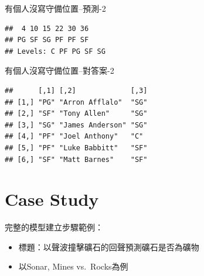 \documentclass[
]{book}
\newenvironment{Shaded}{\begin{snugshade}}{\end{snugshade}}
\newcommand{\CommentTok}[1]{\textcolor[rgb]{0.56,0.35,0.01}{\textit{#1}}}
\newcommand{\DataTypeTok}[1]{\textcolor[rgb]{0.13,0.29,0.53}{#1}}
\newcommand{\KeywordTok}[1]{\textcolor[rgb]{0.13,0.29,0.53}{\textbf{#1}}}
\newcommand{\NormalTok}[1]{#1}
\newcommand{\OperatorTok}[1]{\textcolor[rgb]{0.81,0.36,0.00}{\textbf{#1}}}
\newcommand{\StringTok}[1]{\textcolor[rgb]{0.31,0.60,0.02}{#1}}
\providecommand{\tightlist}{%
  \setlength{\itemsep}{0pt}\setlength{\parskip}{0pt}}
\begin{document}
有個人沒寫守備位置--預測-2

\begin{Shaded}
\end{Shaded}

\begin{verbatim}
##  4 10 15 22 30 36 
## PG SF SG PF PF SF 
## Levels: C PF PG SF SG
\end{verbatim}

有個人沒寫守備位置--對答案-2

\begin{Shaded}
\end{Shaded}

\begin{verbatim}
##      [,1] [,2]             [,3]
## [1,] "PG" "Arron Afflalo"  "SG"
## [2,] "SF" "Tony Allen"     "SG"
## [3,] "SG" "James Anderson" "SG"
## [4,] "PF" "Joel Anthony"   "C" 
## [5,] "PF" "Luke Babbitt"   "SF"
## [6,] "SF" "Matt Barnes"    "SF"
\end{verbatim}

\hypertarget{case-study}{%
\section{Case Study}\label{case-study}}

完整的模型建立步驟範例：

\begin{itemize}
\tightlist
\item
  標題：以聲波撞擊礦石的回聲預測礦石是否為礦物
\item
  以Sonar, Mines vs.~Rocks為例
\end{itemize}
\end{document}
